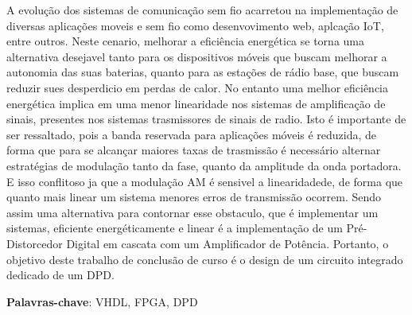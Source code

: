     A evolução dos sistemas de comunicação sem fio acarretou na implementação de diversas aplicações moveis e sem fio como desenvovimento web, aplcação IoT, entre outros. Neste cenario, melhorar a eficiência energética se torna uma alternativa desejavel tanto para os dispositivos móveis que buscam melhorar a autonomia das suas baterias, quanto para as estações de rádio base, que buscam reduzir sues desperdicio em perdas de calor. No entanto uma melhor eficiência energética implica em uma menor linearidade nos sistemas de amplificação de sinais, presentes nos sistemas trasmissores de sinais de radio. Isto é importante de ser ressaltado, pois a banda reservada para aplicações móveis é reduzida, de forma que para se alcançar maiores taxas de trasmissão é necessário alternar estratégias de modulação tanto da fase, quanto da amplitude da onda portadora. E isso conflitoso ja que a modulação AM  é sensivel a linearidadede, de forma que quanto mais linear um sistema menores erros de transmissão ocorrem. Sendo assim uma alternativa para contornar esse obstaculo, que é implementar um sistemas, eficiente energéticamente e linear é a implementação de um Pré-Distorcedor Digital em cascata com um Amplificador de Potência. Portanto, o objetivo deste trabalho de conclusão de curso é o design de um circuito integrado dedicado de um DPD. 

\textbf{Palavras-chave}: VHDL, FPGA, DPD
